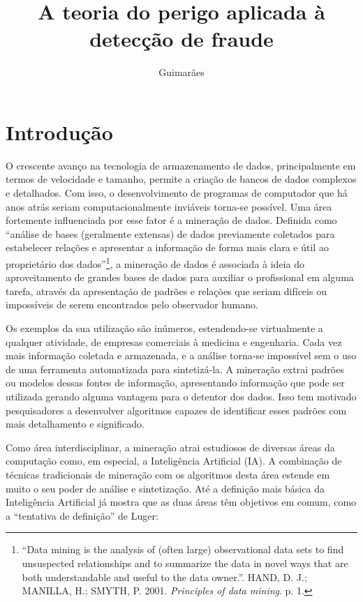 \documentclass{iiufrgs}
\title{A teoria do perigo aplicada à detecção de fraude}
\author{Guimarães}{Bruno Barcarol}
\begin{document}
\maketitle

\tableofcontents

\chapter{Introdução}

O crescente avanço na tecnologia de armazenamento de dados, principalmente em termos de velocidade e tamanho, permite a criação de bancos de dados complexos e detalhados. Com isso, o desenvolvimento de programas de computador que há anos atrás seriam computacionalmente inviáveis torna-se possível. Uma área fortemente influenciada por esse fator é a mineração de dados. Definida como ``análise de bases (geralmente extensas) de dados previamente coletados para estabelecer relações e apresentar a informação de forma mais clara e útil ao proprietário dos dados''\footnote{``Data mining is the analysis of (often large) observational data sets to find unsuspected relationships and to summarize the data in novel ways that are both understandable and useful to the data owner.''. HAND, D. J.; MANILLA, H.; SMYTH, P. 2001. \emph{Principles of data mining}. p. 1.}, a mineração de dados é associada à ideia do aproveitamento de grandes bases de dados para auxiliar o profissional em alguma tarefa, através da apresentação de padrões e relações que seriam difíceis ou impossíveis de serem encontrados pelo observador humano.

Os exemplos da sua utilização são inúmeros, estendendo-se virtualmente a qualquer atividade, de empresas comerciais à medicina e engenharia. Cada vez mais informação coletada e armazenada, e a análise torna-se impossível sem o uso de uma ferramenta automatizada para sintetizá-la. A mineração extrai padrões ou modelos dessas fontes de informação, apresentando informação que pode ser utilizada gerando alguma vantagem para o detentor dos dados. Isso tem motivado pesquisadores a desenvolver algoritmos capazes de identificar esses padrões com mais detalhamento e significado.

Como área interdisciplinar, a mineração atrai estudiosos de diversas áreas da computação como, em especial, a Inteligência Artificial (IA). A combinação de técnicas tradicionais de mineração com os algoritmos desta área estende em muito o seu poder de análise e sintetização. Até a definição mais básica da Inteligência Artificial já mostra que as duas áreas têm objetivos em comum, como a ``tentativa de definição'' de Luger:
\end{document}
